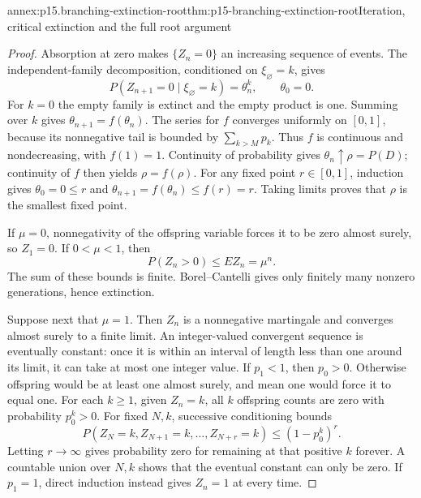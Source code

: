 \begin{annexitem}{annex:p15.branching-extinction-root}{thm:p15-branching-extinction-root}{Iteration, critical extinction and the full root argument}
\begin{proof}
Absorption at zero makes \(\{Z_n=0\}\) an increasing sequence of
events. The independent-family decomposition, conditioned on
\(\xi_\varnothing=k\), gives
\[
            P(Z_{n+1}=0\mid\xi_\varnothing=k)=\theta_n^k,
                         \qquad\theta_0=0.
\]
For \(k=0\) the empty family is extinct and the empty product is one.
Summing over \(k\) gives \(\theta_{n+1}=f(\theta_n)\).
The series for \(f\) converges uniformly on \([0,1]\), because
its nonnegative tail is bounded by \(\sum_{k>M}p_k\).
Thus \(f\) is continuous and nondecreasing, with \(f(1)=1\).
Continuity of probability gives \(\theta_n\uparrow\rho=P(D)\);
continuity of \(f\) then yields \(\rho=f(\rho)\).
For any fixed point \(r\in[0,1]\), induction gives
\(\theta_0=0\leq r\) and
\(\theta_{n+1}=f(\theta_n)\leq f(r)=r\).
Taking limits proves that \(\rho\) is the smallest fixed point.

If \(\mu=0\), nonnegativity of the offspring variable forces it
to be zero almost surely, so \(Z_1=0\).
If \(0<\mu<1\), then
\[
                            P(Z_n>0)\leq EZ_n=\mu^n.
\]
The sum of these bounds is finite. Borel--Cantelli gives only
finitely many nonzero generations, hence extinction.

Suppose next that \(\mu=1\).
Then \(Z_n\) is a nonnegative martingale and converges almost surely
to a finite limit. An integer-valued convergent sequence is
eventually constant: once it is within an interval of length
less than one around its limit, it can take at most one integer value.
If \(p_1<1\), then \(p_0>0\). Otherwise offspring would be at
least one almost surely, and mean one would force it to equal one.
For each \(k\geq1\), given \(Z_n=k\), all \(k\) offspring counts
are zero with probability \(p_0^k>0\).
For fixed \(N,k\), successive conditioning bounds
\[
 P(Z_N=k,Z_{N+1}=k,\ldots,Z_{N+r}=k)
                                 \leq(1-p_0^k)^r .
\]
Letting \(r\to\infty\) gives probability zero for remaining at
that positive \(k\) forever. A countable union over \(N,k\)
shows that the eventual constant can only be zero.
If \(p_1=1\), direct induction instead gives \(Z_n=1\) at every time.


\end{proof}
\end{annexitem}
